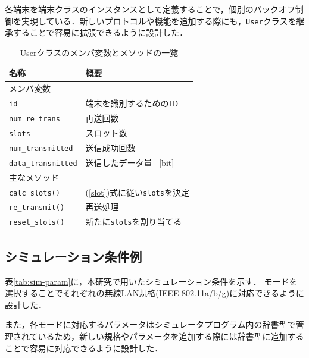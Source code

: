 \documentclass[a4paper,10pt]{ltjsarticle}
\begin{document}
各端末を端末クラスのインスタンスとして定義することで，個別のバックオフ制御を実現している．新しいプロトコルや機能を追加する際にも，\texttt{User}クラスを継承することで容易に拡張できるように設計した．

\begin{table}[H]
  \centering
  \caption{Userクラスのメンバ変数とメソッドの一覧}
  \label{tab:user-class}
  \begin{tabularx}{0.5\textwidth}{l|X}
    \hline
    名称 & 概要 \\
    \hline
    \multicolumn{2}{l}{メンバ変数} \\
    \hline
    \texttt{id} & 端末を識別するためのID\\
    \texttt{num\_re\_trans} & 再送回数\\
    \texttt{slots} & スロット数\\
    \texttt{num\_transmitted} & 送信成功回数\\
    \texttt{data\_transmitted} & 送信したデータ量 \, [bit]\\
    \hline
    \multicolumn{2}{l}{主なメソッド} \\
    \hline
    \texttt{calc\_slots()} &(\ref{slot})式に従い\texttt{slots}を決定\\
    \texttt{re\_transmit()} & 再送処理\\
    \texttt{reset\_slots()} & 新たに\texttt{slots}を割り当てる\\
    \hline
  \end{tabularx}
\end{table}

\subsection{シミュレーション条件例}
表\ref{tab:sim-param}に，本研究で用いたシミュレーション条件を示す．
モードを選択することでそれぞれの無線LAN規格(IEEE 802.11a/b/g)に対応できるように設計した．

また，各モードに対応するパラメータはシミュレータプログラム内の辞書型で管理されているため，新しい規格やパラメータを追加する際には辞書型に追加することで容易に対応できるように設計した．
\end{document}
